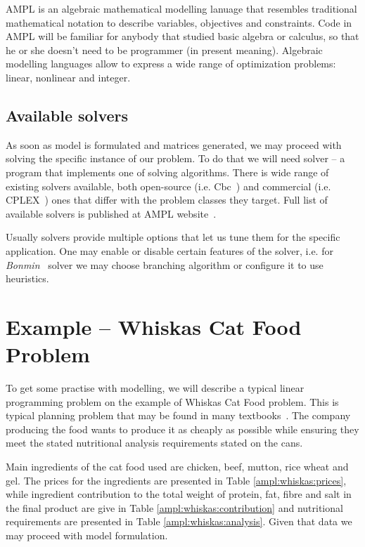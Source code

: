AMPL is an algebraic mathematical modelling lanuage that resembles traditional mathematical notation to describe variables, objectives and constraints. Code in AMPL will be familiar for anybody that studied basic algebra or calculus, so that he or she doesn't need to be programmer (in present meaning). Algebraic modelling languages allow to express a wide range of optimization problems: linear, nonlinear and integer.

\subsection{Available solvers}

As soon as model is formulated and matrices generated, we may proceed with solving the specific instance of our problem. To do that we will need solver -- a program that implements one of solving algorithms. There is wide range of existing solvers available, both open-source (i.e. Cbc~\cite{cbc-solver}) and commercial (i.e. CPLEX~\cite{cplex}) ones that differ with the problem classes they target. Full list of available solvers is published at AMPL website~\cite{AMPLSolvers}.

Usually solvers provide multiple options that let us tune them for the specific application. One may enable or disable certain features of the solver, i.e. for \emph{Bonmin}~\cite{Bonmin} solver we may choose branching algorithm or configure it to use heuristics.

\section{Example -- Whiskas Cat Food Problem}
\label{sec:ampl:whiskas}

To get some practise with modelling, we will describe a typical linear programming problem on the example of Whiskas Cat Food problem. This is typical planning problem that may be found in many textbooks~\cite{dantzig}. The company producing the food wants to produce it as cheaply as possible while ensuring they meet the stated nutritional analysis requirements stated on the cans. 

Main ingredients of the cat food used are chicken, beef, mutton, rice wheat and gel. The prices for the ingredients are presented in Table \ref{ampl:whiskas:prices}, while ingredient contribution to the total weight of protein, fat, fibre and salt in the final product are give in Table \ref{ampl:whiskas:contribution} and nutritional requirements are presented in Table \ref{ampl:whiskas:analysis}. Given that data we may proceed with model formulation.

